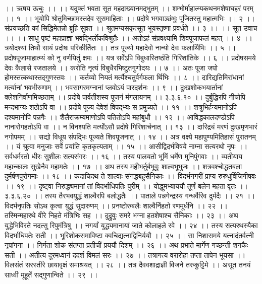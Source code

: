 ।। ऋषय ऊचुः ।। ।।
यदुक्तं भवता सूत महदाख्यानमद्भुतम् ।।
शम्भोर्माहात्म्यकथनमशेषाघहरं परम् ।। १ ।।
भूयोपि श्रोतुमिच्छामस्तदेव सुसमाहिताः ।।
प्रदोषे भगवाञ्छंभुः पूजितस्तु महात्मभिः ।। २ ।।
संप्रयच्छति कां सिद्धिमेतन्नो ब्रूहि सुव्रत ।।
श्रुतमप्यसकृत्सूत भूयस्तृष्णा प्रवर्धते ।। ३ ।।
।। सूत उवाच ।। ।।
साधु पृष्टं महाप्राज्ञा भवद्भिर्लोकविश्रुतैः ।।
अतोऽहं संप्रवक्ष्यामि शिवपूजाफलं महत् ।। ४ ।।
त्रयोदश्यां तिथौ सायं प्रदोषः परिकीर्तितः ।।
तत्र पूज्यो महादेवो नान्यो देवः फलार्थिभिः ।। ५ ।।
प्रदोषपूजामाहात्म्यं को नु वर्णयितुं क्षमः ।।
यत्र सर्वेऽपि विबुधास्तिष्ठंति गिरिशांतिके ।। ६ ।।
प्रदोषसमये देवः कैलासे रजतालये ।।
करोति नृत्यं विबुधैरभिष्टुतगुणोदयः ।। ७ ।।
अतः पूजा जपो होमस्तत्कथास्तद्गुणस्तवः ।।
कर्तव्यो नियतं मर्त्यैश्चतुर्वर्गफला र्थिभिः ।। ८ ।।
दारिद्यतिमिरांधानां मर्त्यानां भवभीरुणाम् ।।
भवसागरमग्नानां प्लवोऽयं पारदर्शनः ।। ९ ।।
दुःखशोकभयार्तानां क्लेशनिर्वाणमिच्छताम् ।।
प्रदोषे पार्वतीशस्य पूजनं मंगलायनम् ।। ३.३.६.१० ।।
दुर्बुद्धिरपि नीचोपि मन्दभाग्यः शठोऽपि वा ।।
प्रदोषे पूज्य देवेशं विपद्भ्यः स प्रमुच्यते ।। ११ ।।
शत्रुभिर्हन्यमानोऽपि दश्यमानोपि पन्नगैः ।।
शैलैराक्रम्यमाणोऽपि पतितोऽपि महांबुधौ ।। १२ ।।
आविद्धकालदण्डोऽपि नानारोगहतोऽपि वा ।।
न विनश्यति मर्त्योऽसौ प्रदोषे गिरिशार्चनात् ।। १३ ।।
दारिद्र्यं मरणं दुःखमृणभारं नगोपमम् ।।
सद्यो विधूय संपद्भिः पूज्यते शिवपूजनात् ।। १४ ।।
अत्र वक्ष्ये महापुण्यमितिहासं पुरातनम् ।।
यं श्रुत्वा मनुजाः सर्वे प्रयांति कृतकृत्यताम् ।। १५ ।।
आसीद्विदर्भविषये नाम्ना सत्यरथो नृपः ।।
सर्वधर्मरतो धीरः सुशीलः सत्यसंगरः ।। १६ ।।
तस्य पालयतो भूमिं धर्मेण मुनिपुंगवाः ।।
व्यतीयाय महान्कालः सुखेनैव महामतेः ।। १७ ।।
अथ तस्य महीभर्तुर्बभूवुः शाल्वभूभुजः ।।
शत्रवश्चोद्धतबला दुर्मर्षणपुरोगमाः ।। १८ ।।
कदाचिदथ ते शाल्वाः संनद्धबहुसैनिकाः ।।
विदर्भनगरीं प्राप्य रुरुधुर्विजिगीषवः ।। १९ ।।
दृष्ट्वा निरुद्ध्यमानां तां विदर्भाधिपतिः पुरीम् ।।
योद्धुमभ्याययौ तूर्णं बलेन महता वृतः ।। ३.३.६.२० ।।
तस्य तैरभवयुद्धं शाल्वैरपि बलोद्धतैः ।।
पाताले पन्नगेन्द्रस्य गन्धर्वैरिव दुर्मदैः ।। २१ ।।
विदर्भनृपतिः सोऽथ कृत्वा युद्धं सुदारुणम् ।।
प्रनष्टोरुबलैः शाल्वैर्निहतो रणमूर्धनि ।। २२ ।।
तस्मिन्महारथे वीरे निहते मंत्रिभिः सह ।।
दुद्रुवुः समरे भग्ना हतशेषाश्च सैनिकाः ।। २३ ।।
अथ युद्धेभिविरते नदत्सु रिपुमंत्रिषु ।।
नगर्यां युद्ध्यमानायां जाते कोलाहले रवे ।। २४ ।।
तस्य सत्यरथस्यैका विदर्भाधिपतेः सती ।।
भूरिशोकसमाविष्टा क्वचिद्यत्नाद्विनिर्ययौ ।। २५ ।।
सा निशासमये यत्नादंतर्वत्नी नृपांगना ।।
निर्गता शोक संतप्ता प्रतीचीं प्रययौ दिशम् ।। २६ ।।
अथ प्रभाते मार्गेण गच्छन्ती शनकैः सती ।।
अतीत्य दूरमध्वानं ददर्श विमलं सरः ।। २७ ।।
तत्रागत्य वरारोहा तप्ता तापेन भूयसा ।।
विलसंतं सरस्तीरे छायावृक्षं समाश्रयत् ।। २८ ।।
तत्र दैववशाद्राज्ञी विजने तरुकुट्टिमे ।।
असूत तनयं साध्वी मूहूर्ते सद्गुणान्विते ।। २९ ।।
